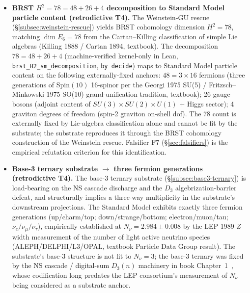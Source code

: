 \documentclass[11pt,a4paper]{amsart}
\theoremstyle{plain}
\theoremstyle{definition}
\begin{document}
\begin{itemize}[itemsep=2pt,leftmargin=2em]
\item \textbf{BRST $H^2 = 78 = 48 + 26 + 4$ decomposition to Standard Model particle content (retrodictive T4).} The Weinstein-GU rescue (\S\ref{subsec:weinstein-rescue}) yields BRST cohomology dimension $H^2 = 78$, matching $\dim E_6 = 78$ from the Cartan--Killing classification of simple Lie algebras (Killing 1888 / Cartan 1894, textbook). The decomposition $78 = 48 + 26 + 4$ (machine-verified kernel-only in Lean, \texttt{brst\_H2\_sm\_decomposition}, \texttt{by decide}) maps to Standard Model particle content on the following externally-fixed anchors: $48 = 3 \times 16$ fermions (three generations of Spin$(10)$ 16-spinor per the Georgi 1975 SU(5) / Fritzsch--Minkowski 1975 SO(10) grand-unification tradition, textbook); 26 gauge bosons (adjoint content of $SU(3) \times SU(2) \times U(1)$ + Higgs sector); 4 graviton degrees of freedom (spin-2 graviton on-shell dof). The 78 count is externally fixed by Lie-algebra classification alone and cannot be fit by the substrate; the substrate reproduces it through the BRST cohomology construction of the Weinstein rescue. Falsifier F7 (\S\ref{sec:falsifiers}) is the empirical refutation criterion for this identification.

\item \textbf{Base-3 ternary substrate $\to$ three fermion generations (retrodictive T4).} The base-3 ternary substrate (\S\ref{subsec:base3-ternary}) is load-bearing on the NS cascade discharge and the $D_3$ algebrization-barrier defeat, and structurally implies a three-way multiplicity in the substrate's downstream projections. The Standard Model exhibits exactly three fermion generations (up/charm/top; down/strange/bottom; electron/muon/tau; $\nu_e/\nu_\mu/\nu_\tau$), empirically established at $N_\nu = 2.984 \pm 0.008$ by the LEP 1989 $Z$-width measurement of the number of light active neutrino species (ALEPH/DELPHI/L3/OPAL, textbook Particle Data Group result). The substrate's base-3 structure is not fit to $N_\nu = 3$; the base-3 ternary was fixed by the NS cascade / digital-sum $D_3(n)$ machinery in book Chapter~1~\cite{cohen2026book}, whose codification long predates the LEP consortium's measurement of $N_\nu$ being considered as a substrate anchor.


\end{itemize}
\end{document}
